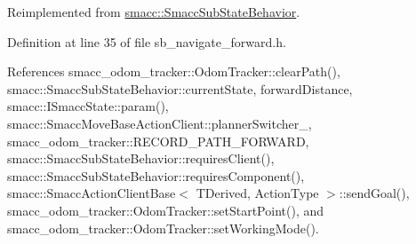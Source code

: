 Reimplemented from \hyperlink{classsmacc_1_1SmaccSubStateBehavior_a47eb8983afa8e1d312873a9a297b84f3}{smacc\+::\+Smacc\+Sub\+State\+Behavior}.



Definition at line 35 of file sb\+\_\+navigate\+\_\+forward.\+h.



References smacc\+\_\+odom\+\_\+tracker\+::\+Odom\+Tracker\+::clear\+Path(), smacc\+::\+Smacc\+Sub\+State\+Behavior\+::current\+State, forward\+Distance, smacc\+::\+I\+Smacc\+State\+::param(), smacc\+::\+Smacc\+Move\+Base\+Action\+Client\+::planner\+Switcher\+\_\+, smacc\+\_\+odom\+\_\+tracker\+::\+R\+E\+C\+O\+R\+D\+\_\+\+P\+A\+T\+H\+\_\+\+F\+O\+R\+W\+A\+RD, smacc\+::\+Smacc\+Sub\+State\+Behavior\+::requires\+Client(), smacc\+::\+Smacc\+Sub\+State\+Behavior\+::requires\+Component(), smacc\+::\+Smacc\+Action\+Client\+Base$<$ T\+Derived, Action\+Type $>$\+::send\+Goal(), smacc\+\_\+odom\+\_\+tracker\+::\+Odom\+Tracker\+::set\+Start\+Point(), and smacc\+\_\+odom\+\_\+tracker\+::\+Odom\+Tracker\+::set\+Working\+Mode().



